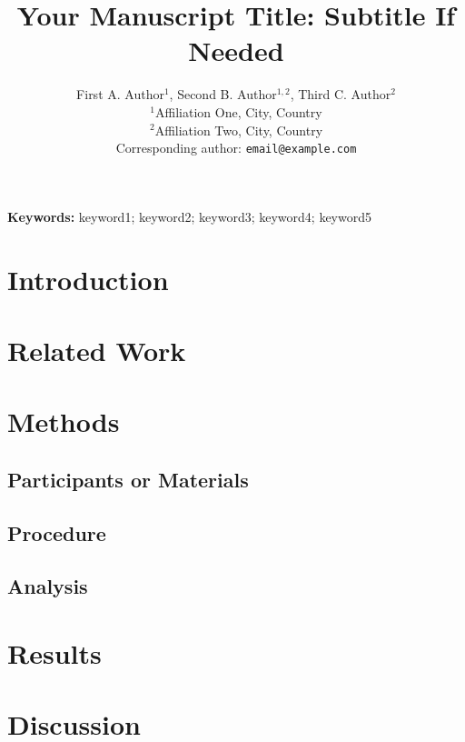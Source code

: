 \documentclass[12pt]{article}
\title{Your Manuscript Title: Subtitle If Needed}
\author{%
  First A. Author$^{1}$, Second B. Author$^{1,2}$, Third C. Author$^{2}$ \\
  $^{1}$Affiliation One, City, Country \\
  $^{2}$Affiliation Two, City, Country \\
  Corresponding author: \texttt{email@example.com}
}
\date{}
\begin{document}
\maketitle

\begin{abstract}
%
\end{abstract}

\noindent\textbf{Keywords:} keyword1; keyword2; keyword3; keyword4; keyword5

\section{Introduction}

\section{Related Work}

\section{Methods}

\subsection{Participants or Materials}

\subsection{Procedure}

\subsection{Analysis}

\section{Results}

\section{Discussion}
\end{document}
